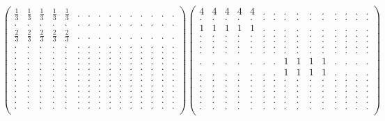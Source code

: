 \documentclass[12pt,a4paper]{amsart}
\begin{document}
\begin{align*}
\left(\begin{array}{rrrrrrrrrrrrrrr}%
\frac13&\frac13&\frac13&\frac13&\frac13&.&.&.&.&.&.&.&.&.&.\\%
.&.&.&.&.&.&.&.&.&.&.&.&.&.&.\\%
\frac23&\frac23&\frac23&\frac23&\frac23&.&.&.&.&.&.&.&.&.&.\\%
.&.&.&.&.&.&.&.&.&.&.&.&.&.&.\\%
.&.&.&.&.&.&.&.&.&.&.&.&.&.&.\\%
.&.&.&.&.&.&.&.&.&.&.&.&.&.&.\\%
.&.&.&.&.&.&.&.&.&.&.&.&.&.&.\\%
.&.&.&.&.&.&.&.&.&.&.&.&.&.&.\\%
.&.&.&.&.&.&.&.&.&.&.&.&.&.&.\\%
.&.&.&.&.&.&.&.&.&.&.&.&.&.&.\\%
.&.&.&.&.&.&.&.&.&.&.&.&.&.&.\\%
.&.&.&.&.&.&.&.&.&.&.&.&.&.&.\\%
.&.&.&.&.&.&.&.&.&.&.&.&.&.&.\\%
.&.&.&.&.&.&.&.&.&.&.&.&.&.&.\\%
.&.&.&.&.&.&.&.&.&.&.&.&.&.&.\\%
\end{array}\right)%
\left(\begin{array}{rrrrrrrrrrrrrrr}%
4&4&4&4&4&.&.&.&.&.&.&.&.&.&.\\%
.&.&.&.&.&.&.&.&.&.&.&.&.&.&.\\%
1&1&1&1&1&.&.&.&.&.&.&.&.&.&.\\%
.&.&.&.&.&.&.&.&.&.&.&.&.&.&.\\%
.&.&.&.&.&.&.&.&.&.&.&.&.&.&.\\%
.&.&.&.&.&.&.&.&.&.&.&.&.&.&.\\%
.&.&.&.&.&.&.&.&.&.&.&.&.&.&.\\%
.&.&.&.&.&.&.&1&1&1&1&.&.&.&.\\%
.&.&.&.&.&.&.&1&1&1&1&.&.&.&.\\%
.&.&.&.&.&.&.&.&.&.&.&.&.&.&.\\%
.&.&.&.&.&.&.&.&.&.&.&.&.&.&.\\%
.&.&.&.&.&.&.&.&.&.&.&.&.&.&.\\%
.&.&.&.&.&.&.&.&.&.&.&.&.&.&.\\%
.&.&.&.&.&.&.&.&.&.&.&.&.&.&.\\%
.&.&.&.&.&.&.&.&.&.&.&.&.&.&.\\%
\end{array}\right)%
\end{align*}
\end{document}
